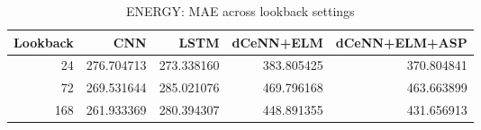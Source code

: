 \begin{table}
\caption{ENERGY: MAE across lookback settings}
\begin{tabular}{rrrrr}
\toprule
Lookback & CNN & LSTM & dCeNN+ELM & dCeNN+ELM+ASP \\
\midrule
24 & 276.704713 & 273.338160 & 383.805425 & 370.804841 \\
72 & 269.531644 & 285.021076 & 469.796168 & 463.663899 \\
168 & 261.933369 & 280.394307 & 448.891355 & 431.656913 \\
\bottomrule
\end{tabular}
\end{table}
